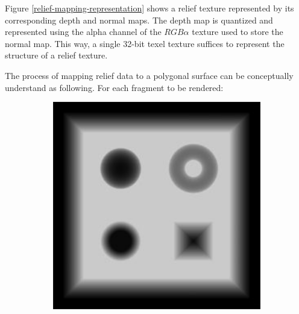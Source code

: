 Figure \ref{relief-mapping-representation} shows a relief texture represented by its corresponding depth and normal maps. The depth map is quantized and represented using the alpha channel of the $RGB\alpha$ texture used to store the normal map. This way, a single 32-bit texel texture suffices to represent the structure of a relief texture.

The process of mapping relief data to a polygonal surface can be conceptually understand as following. For each fragment to be rendered:

\begin{figure}
\begin{center}
	\begin{subfigure}[c]{0.48\textwidth}
		\includegraphics[width=1.0\textwidth]{graphics/df/relief-mapping-representation1}
	\end{subfigure}
	\begin{subfigure}[c]{.48\textwidth}

\end{subfigure}
\end{center}
\end{figure}
